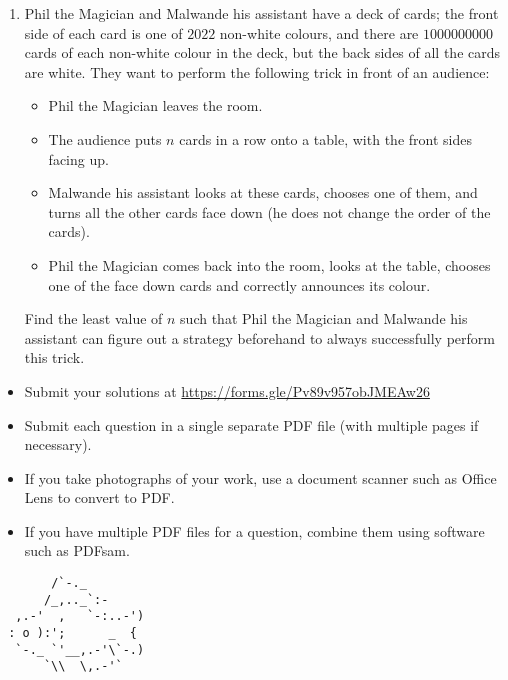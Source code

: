 \documentclass{article}
\begin{document}
\begin{enumerate}[itemsep=\fill]
\item %
Phil the Magician and Malwande his assistant have a deck of cards; the front side of each card is one of $2022$ non-white colours, and there are $1000000000$ cards of each non-white colour in the deck, but the back sides of all the cards are white.
They want to perform the following trick in front of an audience:
\begin{itemize}
  \item Phil the Magician leaves the room.
  \item The audience puts $n$ cards in a row onto a table, with the front sides facing up.
  \item Malwande his assistant looks at these cards, chooses one of them, and turns all the other cards face down (he does not change the order of the cards).
  \item Phil the Magician comes back into the room, looks at the table, chooses one of the face down cards and correctly announces its colour.
\end{itemize}
Find the least value of $n$ such that Phil the Magician and Malwande his assistant can figure out a strategy beforehand to always successfully perform this trick.

\end{enumerate}


\vfill
\footnotesize
\begin{itemize}
	\item Submit your solutions at \href{https://forms.gle/Pv89v957obJMEAw26}{https://forms.gle/Pv89v957obJMEAw26}
	\item Submit each question in a single separate PDF file (with multiple pages if necessary).
	\item If you take photographs of your work, use a document scanner such as Office Lens to convert to PDF.
	\item If you have multiple PDF files for a question, combine them using software such as PDFsam.
\end{itemize}

\centering
\footnotesize
\begin{BVerbatim}
       /`-._
      /_,.._`:-         
  ,.-'  ,   `-:..-')   
 : o ):';      _  {   
  `-._ `'__,.-'\`-.)
      `\\  \,.-'`
\end{BVerbatim}
\end{document}
